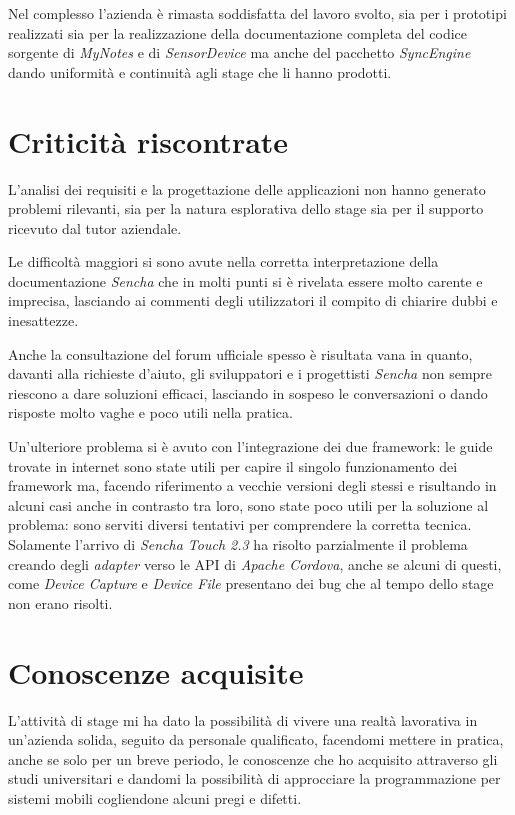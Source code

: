 Nel complesso l'azienda è rimasta soddisfatta del lavoro svolto, sia per i prototipi realizzati sia per la realizzazione della documentazione completa del codice sorgente di \emph{MyNotes} e di \emph{SensorDevice} ma anche del pacchetto \emph{SyncEngine} dando uniformità e continuità agli stage che li hanno prodotti.

\section{Criticità riscontrate}
L'analisi dei requisiti e la progettazione delle applicazioni non hanno generato problemi rilevanti, sia per la natura esplorativa dello stage sia per il supporto ricevuto dal tutor aziendale.

Le difficoltà maggiori si sono avute nella corretta interpretazione della documentazione \emph{Sencha} che in molti punti si è rivelata essere molto carente e imprecisa, lasciando ai commenti degli utilizzatori il compito di chiarire dubbi e inesattezze.

Anche la consultazione del forum ufficiale spesso è risultata vana in quanto, davanti alla richieste d'aiuto, gli sviluppatori e i progettisti \emph{Sencha} non sempre riescono a dare soluzioni efficaci, lasciando in sospeso le conversazioni o dando risposte molto vaghe e poco utili nella pratica.

Un'ulteriore problema si è avuto con l'integrazione dei due framework: le guide trovate in internet sono state utili per capire il singolo funzionamento dei framework ma, facendo riferimento a vecchie versioni degli stessi e risultando in alcuni casi anche in contrasto tra loro, sono state poco utili per la soluzione al problema: sono serviti diversi tentativi per comprendere la corretta tecnica.
Solamente l'arrivo di \emph{Sencha Touch 2.3} ha risolto parzialmente il problema creando degli \emph{adapter} verso le \ac{API} di \emph{Apache Cordova}, anche se alcuni di questi, come \emph{Device Capture} e \emph{Device File} presentano dei bug che al tempo dello stage non erano risolti.

\section{Conoscenze acquisite}
L'attività di stage mi ha dato la possibilità di vivere una realtà lavorativa in un'azienda solida, seguito da personale qualificato, facendomi mettere in pratica, anche se solo per un breve periodo, le conoscenze che ho acquisito attraverso gli studi universitari e dandomi la possibilità di approcciare la programmazione per sistemi mobili cogliendone alcuni pregi e difetti.

